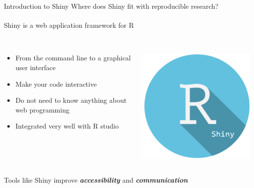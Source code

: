 \documentclass[serif]{beamer}\usepackage[]{graphicx}\usepackage[]{color}
\newcommand{\emtxt}[1]{\textbf{\textit{#1}}}
\begin{document}
\begin{frame}{Introduction to Shiny}
Where does Shiny fit with reproducible research? \\~\\
Shiny is a web application framework for R \\~\\
\begin{columns}
\begin{column}{0.7\textwidth}
\begin{itemize}
\item From the command line to a graphical user interface 
\item Make your code interactive 
\item Do not need to know anything about web programming
\item Integrated very well with R studio \\~\\
\end{itemize}
\end{column}
\begin{column}{0.2\textwidth}
\centerline{\includegraphics[width = \textwidth]{fig/shiny_logo.png}}
\end{column}
\end{columns}
\vspace{0.16in}
Tools like Shiny improve \emtxt{accessibility} and \emtxt{communication} 
\end{frame}
\end{document}

